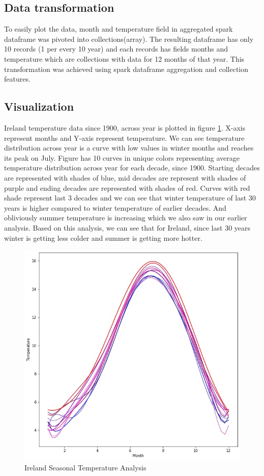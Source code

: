 \documentclass[journal,twoside,web]{ieeecolor}
\begin{document}
\subsection{Data transformation}
To easily plot the data, month and temperature field in aggregated spark dataframe was pivoted into collections(array). The resulting dataframe has only 10 records (1 per every 10 year) and each records has fields months and temperature which are collections with data for 12 months of that year.  This transformation was achieved using spark dataframe aggregation and collection features.

\subsection{Visualization}
Ireland temperature data since 1900, across year is plotted in figure \ref{ISTA}.  X-axis represent months and Y-axis represent temperature.  We can see temperature distribution across year is a curve with low values in winter months and reaches its peak on July.  Figure has 10 curves in unique colors representing average temperature distribution across year for each decade, since 1900. Starting decades are represented with shades of blue, mid decades are represent with shades of purple and ending decades are represented with shades of red. Curves with red shade represent last 3 decades and we can see that winter temperature of last 30 years is higher compared to winter temperature of earlier decades.  And obliviously summer temperature is increasing which we also saw in our earlier analysis.  Based on this analysis, we can see that for Ireland, since last 30 years winter is getting less colder and summer is getting more hotter.

\begin{figure}[h]
\centering
\captionsetup{justification=centering}
\includegraphics[scale=.50]{Ireland_Seasonal_Temperature_Analysis.jpg}
\caption{Ireland Seasonal Temperature Analysis}
\label{ISTA}
\end{figure}
\end{document}
